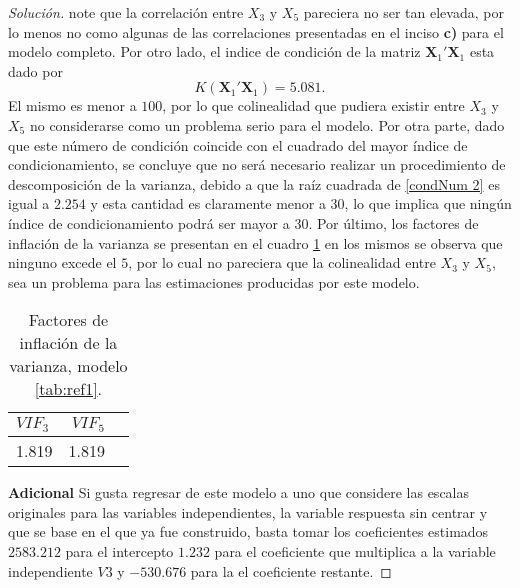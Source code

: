 \documentclass[10.5pt,notitlepage]{article}
\newenvironment{solucion}
  {\begin{proof}[Solución]}
  {\end{proof}}
\theoremstyle{plain}
\begin{document}
\begin{solucion}
note que la correlación entre \(X_3\) y \(X_5\) pareciera no ser tan elevada, por lo menos no como algunas de las correlaciones presentadas en el inciso \textbf{c)} para el modelo completo. Por otro lado, el indice de condición de la matriz \(\mathbf{X}_{1}'\mathbf{X}_{1}\) esta dado por
\begin{equation}\label{condNum 2}
      K(\mathbf{X}_{1}'\mathbf{X}_{1}) =   5.081.
\end{equation}
El mismo es menor a \(100\), por lo que colinealidad que pudiera existir entre \(X_3\) y \(X_5\) no considerarse como un problema serio para el modelo. Por otra parte, dado que este número de condición coincide con el cuadrado del mayor índice de condicionamiento, se concluye que no será necesario realizar un procedimiento de descomposición de la varianza, debido a que la raíz cuadrada de \eqref{condNum 2} es igual a \(2.254\) y esta cantidad es claramente menor a \(30\), lo que implica que ningún índice de condicionamiento podrá ser mayor a 30. Por último, los factores de inflación de la varianza se presentan en el cuadro \ref{tab:ref5} en los mismos se observa que ninguno excede el \(5\), por lo cual no pareciera que la colinealidad entre \(X_3\) y \(X_5\), sea un problema para las estimaciones producidas por este modelo. 
\begin{table}[H]
        \centering
        \begin{tabular}{@{}l@{\hskip 0.3in}r@{\hskip 0.3in}r@{}}
            \toprule
            \(VIF_3\)& \(VIF_5\) \\
            \midrule
             1.819 &1.819 \\  
            \bottomrule
        \end{tabular}
        \caption{Factores de inflación de la varianza, modelo \ref{tab:ref1}.}
        \label{tab:ref5}
\end{table}

\noindent \textbf{Adicional} Si gusta regresar de este modelo a uno que considere las escalas originales para las variables independientes, la variable respuesta sin centrar y que se base en el que ya fue construido, basta tomar los coeficientes estimados \(2583.212\) para el intercepto \(1.232\) para el coeficiente que multiplica a la variable independiente \(V3\) y \(-530.676\) para la  el coeficiente restante.  
\end{solucion}
\end{document}
